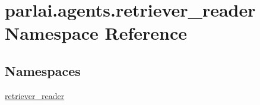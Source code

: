 \hypertarget{namespaceparlai_1_1agents_1_1retriever__reader}{}\section{parlai.\+agents.\+retriever\+\_\+reader Namespace Reference}
\label{namespaceparlai_1_1agents_1_1retriever__reader}
\subsection*{Namespaces}
\begin{DoxyCompactItemize}
\item 
 \hyperlink{namespaceparlai_1_1agents_1_1retriever__reader_1_1retriever__reader}{retriever\+\_\+reader}
\end{DoxyCompactItemize}
